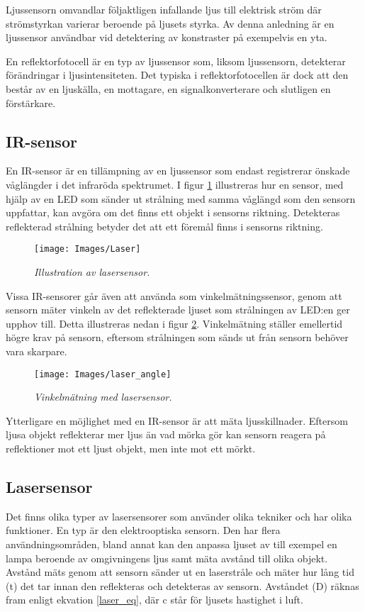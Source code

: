\documentclass[11pt]{article}
\begin{document}
\begin{flushleft}
Ljussensorn omvandlar följaktligen infallande ljus till elektrisk ström där strömstyrkan varierar beroende på ljusets styrka. Av denna anledning är en ljussensor användbar vid detektering av konstraster på exempelvis en yta. \cite{612896}

En reflektorfotocell är en typ av ljussensor som, liksom ljussensorn, detekterar förändringar i ljusintensiteten. Det typiska i reflektorfotocellen är dock att den  består av en ljuskälla, en mottagare, en signalkonverterare och slutligen en förstärkare. \cite{website:automation} 


\subsection{IR-sensor}
En IR-sensor är en tillämpning av en ljussensor som endast registrerar önskade våglängder i det infraröda spektrumet. I figur \ref{Laser} illustreras hur en sensor, med hjälp av en LED som sänder ut strålning med samma våglängd som den sensorn uppfattar, kan avgöra om det finns ett objekt i sensorns riktning. Detekteras reflekterad strålning betyder det att ett föremål finns i sensorns riktning. \cite{website:cmu}

\begin{figure}[htbp]
	\centering
	\texttt{[image: Images/Laser]}
	\caption{\textit{Illustration av lasersensor.} \label{Laser}}
\end{figure}

Vissa IR-sensorer går även att använda som vinkelmätningssensor, genom att sensorn mäter vinkeln av det reflekterade ljuset som strålningen av LED:en ger upphov till. Detta illustreras nedan i figur \ref{laser_angle}. Vinkelmätning ställer emellertid högre krav på sensorn, eftersom strålningen som sänds ut från sensorn behöver vara skarpare.

\begin{figure}[htbp]
	\centering
	\texttt{[image: Images/laser\_angle]}
	\caption{\textit{Vinkelmätning med lasersensor.} \label{laser_angle}}
\end{figure}

Ytterligare en möjlighet med en IR-sensor är att mäta ljusskillnader. Eftersom ljusa objekt reflekterar mer ljus än vad mörka gör kan sensorn reagera på reflektioner mot ett ljust objekt, men inte mot ett mörkt. \cite{website:cmu}

\subsection{Lasersensor}
Det finns olika typer av lasersensorer som använder olika tekniker och har olika funktioner. En typ är den elektrooptiska sensorn. Den har flera användningsområden, bland annat kan den anpassa ljuset av till exempel en lampa beroende av omgivningens ljus samt mäta avstånd till olika objekt. Avstånd mäts genom att sensorn sänder ut en laserstråle och mäter hur lång tid (t) det tar innan den reflekteras och detekteras av sensorn. Avståndet (D) räknas fram enligt ekvation \ref{laser_eq}, där c står för ljusets hastighet i luft. \cite{website:mti}



\end{flushleft}
\end{document}

